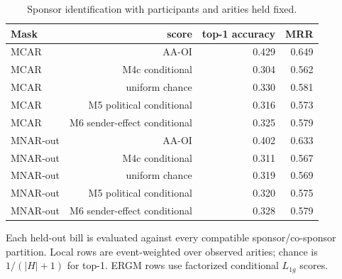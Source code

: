\begin{table}[tbp]
\centering
\small
\caption{Sponsor identification with participants and arities held fixed.}
\label{tab:senate-role}
\begin{tabular}{lrrr}
\toprule
Mask & score & top-1 accuracy & MRR \\
\midrule
MCAR & AA-OI & 0.429 & 0.649 \\
MCAR & M4c conditional & 0.304 & 0.562 \\
MCAR & uniform chance & 0.330 & 0.581 \\
MCAR & M5 political conditional & 0.316 & 0.573 \\
MCAR & M6 sender-effect conditional & 0.325 & 0.579 \\
MNAR-out & AA-OI & 0.402 & 0.633 \\
MNAR-out & M4c conditional & 0.311 & 0.567 \\
MNAR-out & uniform chance & 0.319 & 0.569 \\
MNAR-out & M5 political conditional & 0.320 & 0.575 \\
MNAR-out & M6 sender-effect conditional & 0.328 & 0.579 \\
\bottomrule
\end{tabular}
\par\vspace{2pt}\footnotesize Each held-out bill is evaluated against every compatible sponsor/co-sponsor partition. Local rows are event-weighted over observed arities; chance is $1/(|H|+1)$ for top-1. ERGM rows use factorized conditional $L_{1g}$ scores.
\end{table}
